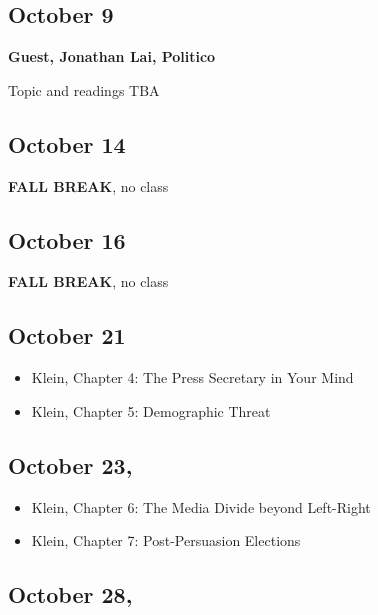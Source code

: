 \documentclass[]{tufte-handout}
\providecommand{\tightlist}{%
  \setlength{\itemsep}{0pt}\setlength{\parskip}{0pt}}
\begin{document}
\hypertarget{october-9}{%
\subsection{October 9}\label{october-9}}

\textbf{Guest, Jonathan Lai, Politico}

Topic and readings TBA

\hypertarget{october-14}{%
\subsection{October 14}\label{october-14}}

\textbf{FALL BREAK}, no class

\hypertarget{october-16}{%
\subsection{October 16}\label{october-16}}

\textbf{FALL BREAK}, no class

\hypertarget{october-21}{%
\subsection{October 21}\label{october-21}}

\begin{itemize}
\tightlist
\item
  Klein, Chapter 4: The Press Secretary in Your Mind
\item
  Klein, Chapter 5: Demographic Threat
\end{itemize}

\hypertarget{october-23}{%
\subsection{October 23,}\label{october-23}}

\begin{itemize}
\tightlist
\item
  Klein, Chapter 6: The Media Divide beyond Left-Right
\item
  Klein, Chapter 7: Post-Persuasion Elections
\end{itemize}

\hypertarget{october-28}{%
\subsection{October 28,}\label{october-28}}
\end{document}
